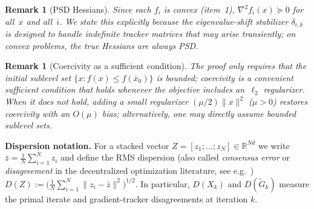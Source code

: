 \documentclass[11pt,a4paper]{article}
\def\cO{O}%
\newtheorem{remark}[theorem]{Remark}
\newcommand{\R}{\mathbb{R}}
\newcommand{\cO}{\mathcal{O}}
\begin{document}
	\begin{remark}[PSD Hessians]
	Since each $f_i$ is convex (item~1), $\nabla^2 f_i(x)\succeq 0$
	for all~$x$ and all~$i$.
	We state this explicitly because the eigenvalue-shift stabilizer
	$\delta_{i,k}$ is designed to handle indefinite tracker matrices
	that may arise transiently; on convex problems, the true Hessians
	are always PSD.
	\end{remark}
	
	\begin{remark}[Coercivity as a sufficient condition]
	The proof only requires that the initial sublevel set
	$\{x : f(x) \le f(\bar x_0)\}$ is bounded;
	coercivity is a convenient sufficient condition that holds
	whenever the objective includes an~$\ell_2$ regularizer.
	When it does not hold, adding a small regularizer
	$(\mu/2)\|x\|^2$ ($\mu>0$) restores coercivity with an $\cO(\mu)$ bias;
	alternatively, one may directly assume bounded sublevel sets.
	\end{remark}
	

	\noindent\textbf{Dispersion notation.}
	For a stacked vector $Z=[z_1;\dots;z_N]\in\R^{Nd}$
	we write $\bar z=\frac1N\sum_{i=1}^N z_i$ and define the RMS dispersion
	(also called \emph{consensus error} or \emph{disagreement} in the
	decentralized optimization literature, see e.g.\
	\citet{nedic2009subgradient,nedic2017diging})
	\(
	  D(Z):=\bigl(\tfrac1N\sum_{i=1}^N\|z_i-\bar z\|^2\bigr)^{1/2}.
	\)
	In particular, $D(X_k)$ and $D(\tilde G_k)$ measure the primal
	iterate and gradient-tracker disagreements at iteration $k$.
\end{document}
